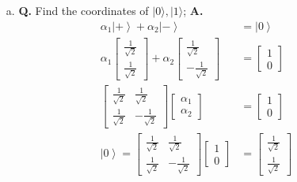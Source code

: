 \documentclass[main.tex]{subfiles}
\begin{document}
\begin{enumerate}
    \begin{enumerate}
        \item[a.] \textbf{Q.} Find the coordinates of $|0\rangle,|1\rangle$; \textbf{A.}
        \begin{align*}
            \alpha_{1}\left|+\right\rangle+\alpha_{2}\left|-\right\rangle                                       & = \left|0\right\rangle\\
            \alpha_{1} \left[\begin{array}{l} \frac{1}{\sqrt{2}} \\ \frac{1}{\sqrt{2}} \end{array}\right]
            + \alpha_{2} \left[\begin{array}{l} \frac{1}{\sqrt{2}} \\ -\frac{1}{\sqrt{2}} \end{array}\right]    & = \left[\begin{array}{l} 1 \\ 0 \end{array}\right]\\
            \left[\begin{array}{ll} \frac{1}{\sqrt{2}} & \frac{1}{\sqrt{2}} 
            \\ \frac{1}{\sqrt{2}} & -\frac{1}{\sqrt{2}} \end{array}\right]
            \left[\begin{array}{c} \alpha_{1} \\ \alpha_{2} \end{array}\right]                                  & = \left[\begin{array}{c} 1 \\ 0 \end{array}\right] \tag{matrix is unitary, inverse is the adjoint} \\
            \left|0\right\rangle = 
            \left[\begin{array}{ll} \frac{1}{\sqrt{2}} & \frac{1}{\sqrt{2}} 
            \\ \frac{1}{\sqrt{2}} & -\frac{1}{\sqrt{2}} \end{array}\right]
            \left[\begin{array}{c} 1 \\ 0 \end{array}\right]                                                    & = \left[\begin{array}{c} \frac{1}{\sqrt{2}} \\ \frac{1}{\sqrt{2}} \end{array}\right] \tag{new basis}\\

\end{align*}
\end{enumerate}
\end{enumerate}
\end{document}
